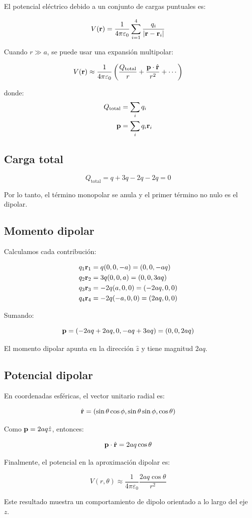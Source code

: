 \documentclass[12pt]{article}
\begin{document}
El potencial eléctrico debido a un conjunto de cargas puntuales es:

\[
V(\vb{r}) = \frac{1}{4\pi \varepsilon_0} \sum_{i=1}^4 \frac{q_i}{\abs{\vb{r} - \vb{r}_i}}
\]

Cuando \( r \gg a \), se puede usar una expansión multipolar:

\[
V(\vb{r}) \approx \frac{1}{4\pi \varepsilon_0} \left( \frac{Q_{\text{total}}}{r} + \frac{\vb{p} \cdot \hat{\vb{r}}}{r^2} + \cdots \right)
\]

donde:
\begin{align*}
Q_{\text{total}} &= \sum_i q_i \\
\vb{p} &= \sum_i q_i \vb{r}_i
\end{align*}

\subsection*{Carga total}

\[
Q_{\text{total}} = q + 3q - 2q - 2q = 0
\]

Por lo tanto, el término monopolar se anula y el primer término no nulo es el dipolar.

\subsection*{ Momento dipolar}

Calculamos cada contribución:

\begin{align*}
q_1 \vb{r}_1 &= q (0, 0, -a) = (0, 0, -aq) \\
q_2 \vb{r}_2 &= 3q (0, 0, a) = (0, 0, 3aq) \\
q_3 \vb{r}_3 &= -2q (a, 0, 0) = (-2aq, 0, 0) \\
q_4 \vb{r}_4 &= -2q (-a, 0, 0) = (2aq, 0, 0)
\end{align*}

Sumando:

\[
\vb{p} = (-2aq + 2aq, 0, -aq + 3aq) = (0, 0, 2aq)
\]

El momento dipolar apunta en la dirección \( \hat{z} \) y tiene magnitud \( 2aq \).

\subsection*{ Potencial dipolar}

En coordenadas esféricas, el vector unitario radial es:

\[
\hat{\vb{r}} = (\sin \theta \cos \phi, \sin \theta \sin \phi, \cos \theta)
\]

Como \( \vb{p} = 2aq \hat{z} \), entonces:

\[
\vb{p} \cdot \hat{\vb{r}} = 2aq \cos \theta
\]

Finalmente, el potencial en la aproximación dipolar es:

\[
\boxed{
V(r, \theta) \approx \frac{1}{4\pi \varepsilon_0} \frac{2aq \cos \theta}{r^2}
}
\]

Este resultado muestra un comportamiento de dipolo orientado a lo largo del eje \( z \).
\end{document}
